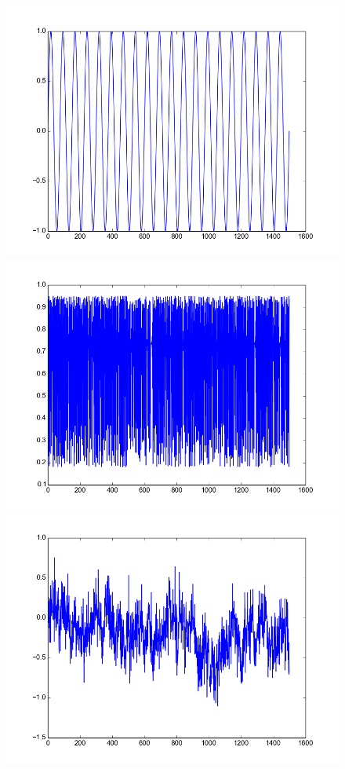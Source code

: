 \documentclass[12pt]{article}
\begin{document}
\begin{figure}\label{fig:stack_ts_plots}
  \begin{center}
    \includegraphics[scale=0.4]{plot_sinusoid}
    \includegraphics[scale=0.4]{plot_logistic}
    \includegraphics[scale=0.4]{plot_fbm}

\end{center}
\end{figure}
\end{document}
